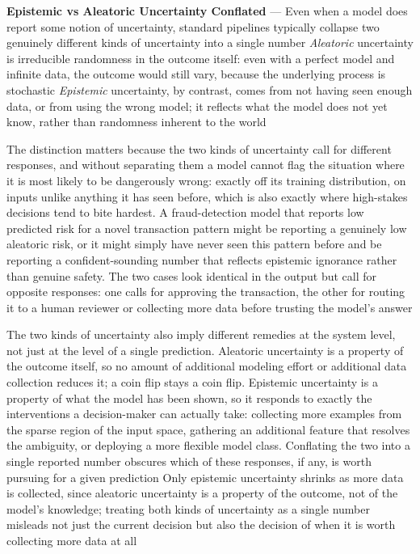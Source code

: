 \textbf{Epistemic vs Aleatoric Uncertainty Conflated} --- Even when a model does
report some notion of uncertainty, standard pipelines typically collapse two
genuinely different kinds of uncertainty into a single number \emph{Aleatoric} uncertainty
is irreducible randomness in the outcome itself: even with a perfect model and
infinite data, the outcome would still vary, because the underlying process is
stochastic \emph{Epistemic} uncertainty, by contrast, comes from not having seen
enough data, or from using the wrong model; it reflects what the model does not yet
know, rather than randomness inherent to the world

The distinction matters because the two kinds of uncertainty call for different responses,
and without separating them a model cannot flag the situation where it is most
likely to be dangerously wrong: exactly off its training distribution, on inputs
unlike anything it has seen before, which is also exactly where high-stakes decisions
tend to bite hardest. A fraud-detection model that reports low predicted risk
for a novel transaction pattern might be reporting a genuinely low aleatoric
risk, or it might simply have never seen this pattern before and be reporting a confident-sounding
number that reflects epistemic ignorance rather than genuine safety. The two
cases look identical in the output but call for opposite responses: one calls for
approving the transaction, the other for routing it to a human reviewer or
collecting more data before trusting the model's answer

The two kinds of uncertainty also imply different remedies at the system level,
not just at the level of a single prediction. Aleatoric uncertainty is a property
of the outcome itself, so no amount of additional modeling effort or additional
data collection reduces it; a coin flip stays a coin flip. Epistemic uncertainty
is a property of what the model has been shown, so it responds to exactly the interventions
a decision-maker can actually take: collecting more examples from the sparse
region of the input space, gathering an additional feature that resolves the ambiguity,
or deploying a more flexible model class. Conflating the two into a single reported
number obscures which of these responses, if any, is worth pursuing for a given prediction
Only epistemic uncertainty shrinks as more data is collected, since aleatoric uncertainty
is a property of the outcome, not of the model's knowledge; treating both kinds of
uncertainty as a single number misleads not just the current decision but also the
decision of when it is worth collecting more data at all

